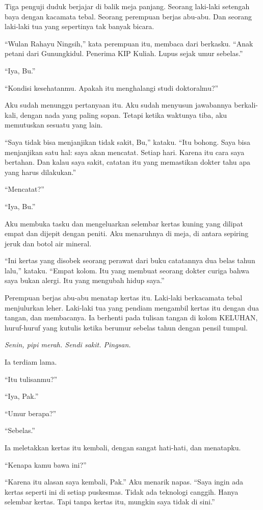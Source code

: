 \documentclass[11pt,twoside,openany]{book}
\begin{document}
Tiga penguji duduk berjajar di balik meja panjang. Seorang laki-laki setengah baya dengan kacamata tebal. Seorang perempuan berjas abu-abu. Dan seorang laki-laki tua yang sepertinya tak banyak bicara.

``Wulan Rahayu Ningsih,'' kata perempuan itu, membaca dari berkasku. ``Anak petani dari Gunungkidul. Penerima KIP Kuliah. Lupus sejak umur sebelas.''

``Iya, Bu.''

``Kondisi kesehatanmu. Apakah itu menghalangi studi doktoralmu?''

Aku sudah menunggu pertanyaan itu. Aku sudah menyusun jawabannya berkali-kali, dengan nada yang paling sopan. Tetapi ketika waktunya tiba, aku memutuskan sesuatu yang lain.

``Saya tidak bisa menjanjikan tidak sakit, Bu,'' kataku. ``Itu bohong. Saya bisa menjanjikan satu hal: saya akan mencatat. Setiap hari. Karena itu cara saya bertahan. Dan kalau saya sakit, catatan itu yang memastikan dokter tahu apa yang harus dilakukan.''

``Mencatat?''

``Iya, Bu.''

Aku membuka tasku dan mengeluarkan selembar kertas kuning yang dilipat empat dan dijepit dengan peniti. Aku menaruhnya di meja, di antara sepiring jeruk dan botol air mineral.

``Ini kertas yang disobek seorang perawat dari buku catatannya dua belas tahun lalu,'' kataku. ``Empat kolom. Itu yang membuat seorang dokter curiga bahwa saya bukan alergi. Itu yang mengubah hidup saya.''

Perempuan berjas abu-abu menatap kertas itu. Laki-laki berkacamata tebal menjulurkan leher. Laki-laki tua yang pendiam mengambil kertas itu dengan dua tangan, dan membacanya. Ia berhenti pada tulisan tangan di kolom KELUHAN, huruf-huruf yang kutulis ketika berumur sebelas tahun dengan pensil tumpul.

\emph{Senin, pipi merah. Sendi sakit. Pingsan.}

Ia terdiam lama.

``Itu tulisanmu?''

``Iya, Pak.''

``Umur berapa?''

``Sebelas.''

Ia meletakkan kertas itu kembali, dengan sangat hati-hati, dan menatapku.

``Kenapa kamu bawa ini?''

``Karena itu alasan saya kembali, Pak.'' Aku menarik napas. ``Saya ingin ada kertas seperti ini di setiap puskesmas. Tidak ada teknologi canggih. Hanya selembar kertas. Tapi tanpa kertas itu, mungkin saya tidak di sini.''
\end{document}
